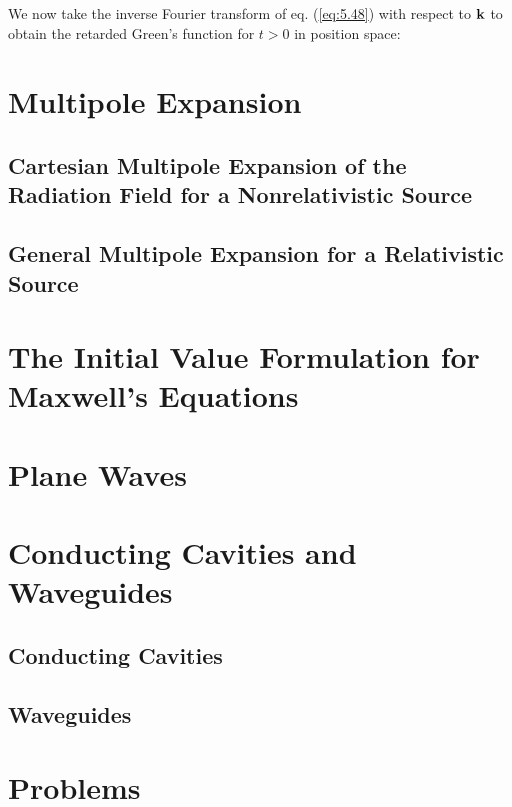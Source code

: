 We now take the inverse Fourier transform of eq. (\ref{eq:5.48}) with respect to $\vb{k}$ to obtain the retarded Green's function for $t > 0$ in position space:  

\section{Multipole Expansion}\label{sec:5.3}

\subsection{Cartesian Multipole Expansion of the Radiation Field for a Nonrelativistic Source}

\subsection{General Multipole Expansion for a Relativistic Source}

\section{The Initial Value Formulation for Maxwell's Equations}\label{sec:5.4}

\section{Plane Waves}\label{sec:5.5}

\section{Conducting Cavities and Waveguides}\label{sec:5.6}

\subsection{Conducting Cavities}

\subsection{Waveguides}


\section*{Problems}


